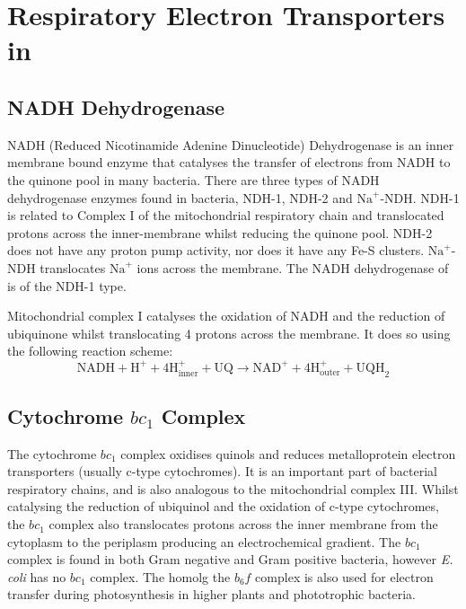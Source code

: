 \section{Respiratory Electron Transporters in \Nm{}}
\subsection{NADH Dehydrogenase}
NADH (Reduced Nicotinamide Adenine Dinucleotide) Dehydrogenase is an inner membrane bound enzyme that catalyses the transfer of electrons from NADH to the quinone pool in many bacteria. There are three types of NADH dehydrogenase enzymes found in bacteria, NDH-1, NDH-2 and $\mathrm{Na}^+$-NDH. NDH-1 is related to Complex I of the mitochondrial respiratory chain and translocated protons across the inner-membrane whilst reducing the quinone pool\cite{Weiss1991,Carroll2003,Friedrich2004}. NDH-2 does not have any proton pump activity, nor does it have any Fe-S clusters\cite{Yagi1991}. $\mathrm{Na}^+$-NDH translocates $\mathrm{Na}^+$ ions across the membrane\cite{Gemperli2002}. The NADH dehydrogenase of \Nm{} is of the NDH-1 type\cite{Deeudom2007}.

Mitochondrial complex I catalyses the oxidation of NADH and the reduction of ubiquinone whilst translocating 4 protons across the membrane. It does so using the following reaction scheme:
\begin{equation}
\mathrm{NADH} + \mathrm{H}^+ + 4\mathrm{H}^+_{\mathrm{inner}} + \mathrm{UQ} \rightarrow \mathrm{NAD}^+ + 4\mathrm{H}^+_{\mathrm{outer}} + \mathrm{UQH}_2
\end{equation}

\subsection{\texorpdfstring{Cytochrome $bc_\mathrm{1}$ Complex}{Cytochrome bc1 Complex}}
The cytochrome $bc_\mathrm{1}$ complex oxidises quinols and reduces metalloprotein electron transporters (usually c-type cytochromes). It is an important part of bacterial respiratory chains, and is also analogous to the mitochondrial complex III\cite{Thoeny-Meyer1997}. Whilst catalysing the reduction of ubiquinol and the oxidation of c-type cytochromes, the $bc_\mathrm{1}$ complex also translocates protons across the inner membrane from the cytoplasm to the periplasm producing an electrochemical gradient. The $bc_\mathrm{1}$ complex is found in both Gram negative and Gram positive bacteria, however \textit{E. coli} has no $bc_\mathrm{1}$ complex. The homolg the $b_6f$ complex is also used for electron transfer during photosynthesis in higher plants and phototrophic bacteria\cite{Darrouzet1999}.

